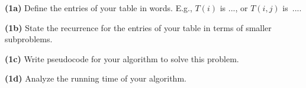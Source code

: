 \documentclass[12pt,twoside]{article}
\begin{document}
\newpage

\vspace*{1in}

{\bf (1a) } Define the entries of your table in words.  E.g., $T(i)$ is ..., or $T(i,j)$ is~....

\vspace{2in}

{\bf (1b) } State the recurrence for the entries of your table in
terms of smaller subproblems.

\newpage

{\bf (1c) } Write pseudocode for your algorithm to solve this problem.

\vspace{6in}

{\bf (1d) } Analyze the running time of your algorithm.
\end{document}
